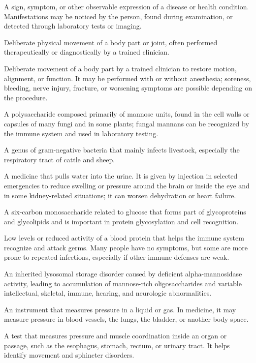  A sign, symptom, or other observable expression of a disease or health condition. Manifestations may be noticed by the person, found during examination, or detected through laboratory tests or imaging.

 Deliberate physical movement of a body part or joint, often performed therapeutically or diagnostically by a trained clinician.

 Deliberate movement of a body part by a trained clinician to restore motion, alignment, or function. It may be performed with or without anesthesia; soreness, bleeding, nerve injury, fracture, or worsening symptoms are possible depending on the procedure.

 A polysaccharide composed primarily of mannose units, found in the cell walls or capsules of many fungi and in some plants; fungal mannans can be recognized by the immune system and used in laboratory testing.

 A genus of gram-negative bacteria that mainly infects livestock, especially the respiratory tract of cattle and sheep.

 A medicine that pulls water into the urine. It is given by injection in selected emergencies to reduce swelling or pressure around the brain or inside the eye and in some kidney-related situations; it can worsen dehydration or heart failure.

 A six-carbon monosaccharide related to glucose that forms part of glycoproteins and glycolipids and is important in protein glycosylation and cell recognition.

 Low levels or reduced activity of a blood protein that helps the immune system recognize and attack germs. Many people have no symptoms, but some are more prone to repeated infections, especially if other immune defenses are weak.

 An inherited lysosomal storage disorder caused by deficient alpha-mannosidase activity, leading to accumulation of mannose-rich oligosaccharides and variable intellectual, skeletal, immune, hearing, and neurologic abnormalities.

 An instrument that measures pressure in a liquid or gas. In medicine, it may measure pressure in blood vessels, the lungs, the bladder, or another body space.

 A test that measures pressure and muscle coordination inside an organ or passage, such as the esophagus, stomach, rectum, or urinary tract. It helps identify movement and sphincter disorders.

